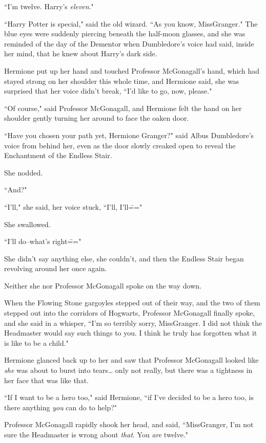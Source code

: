 ``I'm twelve. Harry's \emph{eleven}."

``Harry Potter is special," said the old wizard. ``As you know, Miss\?Granger." The blue eyes were suddenly piercing beneath the half-moon glasses, and she was reminded of the day of the Dementor when Dumbledore's voice had said, inside her mind, that he knew about Harry's dark side.

Hermione put up her hand and touched Professor McGonagall's hand, which had stayed strong on her shoulder this whole time, and Hermione said, she was surprised that her voice didn't break, ``I'd like to go, now, please."

``Of course," said Professor McGonagall, and Hermione felt the hand on her shoulder gently turning her around to face the oaken door.

``Have you chosen your path yet, Hermione Granger?" said Albus Dumbledore's voice from behind her, even as the door slowly creaked open to reveal the Enchantment of the Endless Stair.

She nodded.

``And?"

``I'll," she said, her voice stuck, ``I'll, I'll\==="

She swallowed.

``I'll do\---what's right\==="

She didn't say anything else, she couldn't, and then the Endless Stair began revolving around her once again.

Neither she nor Professor McGonagall spoke on the way down.

When the Flowing Stone gargoyles stepped out of their way, and the two of them stepped out into the corridors of Hogwarts, Professor McGonagall finally spoke, and she said in a whisper, ``I'm so terribly sorry, Miss\?Granger. I did not think the Headmaster would say such things to you. I think he truly has forgotten what it is like to be a child."

Hermione glanced back up to her and saw that Professor McGonagall looked like \emph{she} was about to burst into tears{\ldots} only not really, but there was a tightness in her face that was like that.

``If I want to be a hero too," said Hermione, ``if I've decided to be a hero too, is there anything \emph{you} can do to help?"

Professor McGonagall rapidly shook her head, and said, ``Miss\?Granger, I'm not sure the Headmaster is wrong about \emph{that}. You \emph{are} twelve."

